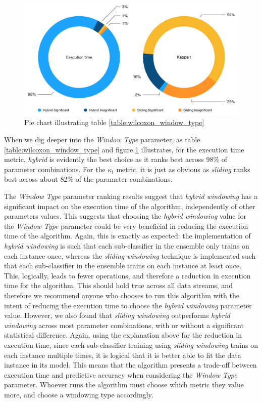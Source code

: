 \begin{figure}
  \includegraphics[width=\linewidth]{./images/chapter5/wilcoxon_window_type_pie}
\caption{\label{fig:wilcoxon_window_type_pie}Pie chart illustrating table \ref{table:wilcoxon_window_type}}
\end{figure}


When we dig deeper into the \textit{Window Type} parameter, as table \ref{table:wilcoxon_window_type} and figure \ref{fig:wilcoxon_window_type_pie} illustrates, for the execution time metric, \textit{hybrid} is evidently the best choice as it ranks best across 98\% of parameter combinations. For the $\kappa_t$ metric, it is just as obvious as \textit{sliding} ranks best across about 82\% of the parameter combinations. 

The \textit{Window Type} parameter ranking results suggest that \textit{hybrid windowing} has a significant impact on the execution time of the algorithm, independently of other parameters values. This suggests that choosing the \textit{hybrid windowing} value for the \textit{Window Type} parameter could be very beneficial in reducing the execution time of the algorithm. Again, this is exactly as expected: the implementation of \textit{hybrid windowing} is such that each sub-classifier in the ensemble only trains on each instance once, whereas the \textit{sliding windowing} technique is implemented such that each sub-classifier in the ensemble trains on each instance at least once. This, logically, leads to fewer operations, and therefore a reduction in execution time for the algorithm. This should hold true across all data streams, and therefore we recommend anyone who chooses to run this algorithm with the intent of reducing the execution time to choose the \textit{hybrid windowing} parameter value.
However, we also found that \textit{sliding windowing} outperforms \textit{hybrid windowing} across most parameter combinations, with or without a significant statistical difference. Again, using the explanation above for the reduction in execution time, since each sub-classifier training using \textit{sliding windowing} trains on each instance multiple times, it is logical that it is better able to fit the data instance in its model. 
This means that the algorithm presents a trade-off between execution time and predictive accuracy when considering the \textit{Window Type} parameter. Whoever runs the algorithm must choose which metric they value more, and choose a windowing type accordingly.

